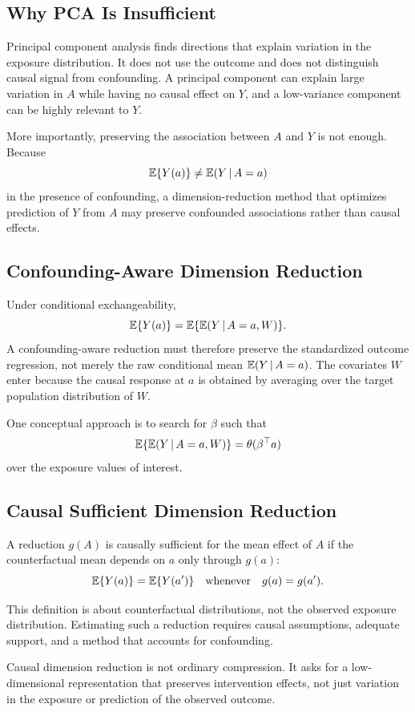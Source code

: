 \subsection{Why PCA Is Insufficient}

Principal component analysis finds directions that explain variation in the
exposure distribution. It does not use the outcome and does not distinguish
causal signal from confounding. A principal component can explain large
variation in $A$ while having no causal effect on $Y$, and a low-variance
component can be highly relevant to $Y$.

More importantly, preserving the association between $A$ and $Y$ is not enough.
Because
\[
  \mathbb{E}\{Y(a)\}\ne \mathbb{E}(Y\,\vert\, A=a)
\]
in the presence of confounding, a dimension-reduction method that optimizes
prediction of $Y$ from $A$ may preserve confounded associations rather than
causal effects.

\subsection{Confounding-Aware Dimension Reduction}

Under conditional exchangeability,
\[
  \mathbb{E}\{Y(a)\}=\mathbb{E}\{\mathbb{E}(Y\,\vert\, A=a,W)\}.
\]
A confounding-aware reduction must therefore preserve the standardized outcome
regression, not merely the raw conditional mean $\mathbb{E}(Y\,\vert\, A=a)$. The
covariates $W$ enter because the causal response at $a$ is obtained by averaging
over the target population distribution of $W$.

One conceptual approach is to search for $\beta$ such that
\[
  \mathbb{E}\{\mathbb{E}(Y\,\vert\, A=a,W)\}
  =
  \theta(\beta^\top a)
\]
over the exposure values of interest.

\subsection{Causal Sufficient Dimension Reduction}

\begin{definition}
A reduction $g(A)$ is causally sufficient for the mean effect of $A$ if the
counterfactual mean depends on $a$ only through $g(a)$:
\[
  \mathbb{E}\{Y(a)\}=\mathbb{E}\{Y(a')\}
  \quad\text{whenever}\quad g(a)=g(a').
\]
\end{definition}

This definition is about counterfactual distributions, not the observed exposure
distribution. Estimating such a reduction requires causal assumptions, adequate
support, and a method that accounts for confounding.

\begin{keyidea}
Causal dimension reduction is not ordinary compression. It asks for a
low-dimensional representation that preserves intervention effects, not just
variation in the exposure or prediction of the observed outcome.
\end{keyidea}
